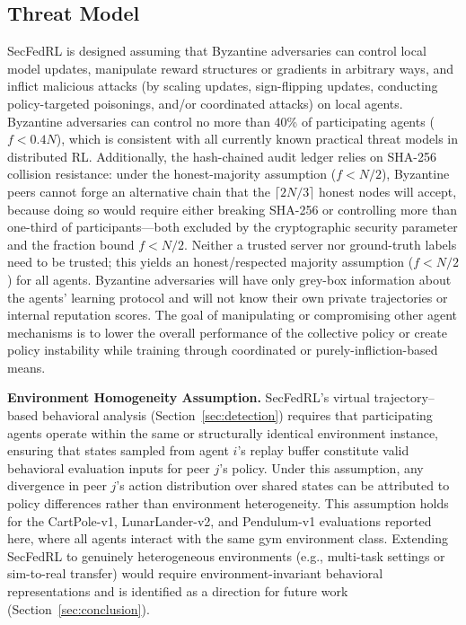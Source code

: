 \documentclass[12pt,a4paper]{article}
\begin{document}
\subsection{Threat Model}
\label{sec:threat}

SecFedRL is designed assuming that Byzantine adversaries can control local model
updates, manipulate reward structures or gradients in arbitrary ways, and inflict
malicious attacks (by scaling updates, sign-flipping updates, conducting
policy-targeted poisonings, and/or coordinated attacks) on local agents. Byzantine
adversaries can control no more than 40\% of participating agents ($f < 0.4N$), which
is consistent with all currently known practical threat models in distributed RL.
Additionally, the hash-chained audit ledger relies on SHA-256 collision resistance: under the
honest-majority assumption ($f < N/2$), Byzantine peers cannot forge an alternative chain that
the $\lceil 2N/3 \rceil$ honest nodes will accept, because doing so would require either
breaking SHA-256 or controlling more than one-third of participants---both excluded by the
cryptographic security parameter and the fraction bound $f < N/2$. Neither a trusted server nor ground-truth
labels need to be trusted; this yields an honest/respected majority assumption
($f < N/2$) for all agents. Byzantine adversaries will have only grey-box information
about the agents' learning protocol and will not know their own private trajectories or
internal reputation scores. The goal of manipulating or compromising other agent
mechanisms is to lower the overall performance of the collective policy or create
policy instability while training through coordinated or purely-infliction-based means.

\noindent\textbf{Environment Homogeneity Assumption.}
SecFedRL's virtual trajectory--based behavioral analysis (Section~\ref{sec:detection})
requires that participating agents operate within the same or structurally identical
environment instance, ensuring that states sampled from agent $i$'s replay buffer
constitute valid behavioral evaluation inputs for peer $j$'s policy. Under this
assumption, any divergence in peer $j$'s action distribution over shared states can be
attributed to policy differences rather than environment heterogeneity. This assumption
holds for the CartPole-v1, LunarLander-v2, and Pendulum-v1 evaluations reported here,
where all agents interact with the same gym environment class. Extending SecFedRL to
genuinely heterogeneous environments (e.g., multi-task settings or sim-to-real
transfer) would require environment-invariant behavioral representations and is
identified as a direction for future work (Section~\ref{sec:conclusion}).
\end{document}
